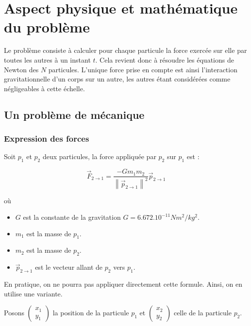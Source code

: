 \chapter{Aspect physique et mathématique du problème}
Le problème consiste à calculer pour chaque particule la force exercée sur elle par toutes les autres à un instant $t$.
Cela revient donc à résoudre les équations de Newton des $N$ particules. L'unique force prise en compte est ainsi l'interaction gravitationnelle d'un corps sur un autre, les autres étant considérées comme négligeables à cette échelle.

\section{Un problème de mécanique}
\vspace{2mm}
\subsection{Expression des forces}
\vspace{2mm}

Soit $p_{1}$ et $p_{2}$ deux particules, la force appliquée par $p_2$ sur $p_1$ est :

\begin{equation}
\vec{F}_{2 \rightarrow 1} = \frac{-Gm_1m_2}{{\left\| \vec{p}_{2 \rightarrow 1} \right\|}^2} \vec{p}_{2 \rightarrow 1}
\end{equation}

où 
\begin{itemize}
\item  $G$ est la constante de la gravitation $G = {6.672.10^{-11}}{Nm^2/kg^2}$.

\item $m_1$ est la masse de $p_1$.
\item $m_2$ est la masse de $p_2$.
\item $\vec{p}_{2 \rightarrow 1}$ est le vecteur  allant de $p_2$ vers $p_1$.


\end{itemize}

\vspace{2mm}

En pratique, on ne pourra pas appliquer directement cette formule. Ainsi, on en utilise une variante.

Posons $\begin{pmatrix}
x_1\\
y_1
\end{pmatrix}$ la position de la particule $p_1$ et $\begin{pmatrix}
x_2\\
y_2
\end{pmatrix}$ celle de la particule $p_2$.

